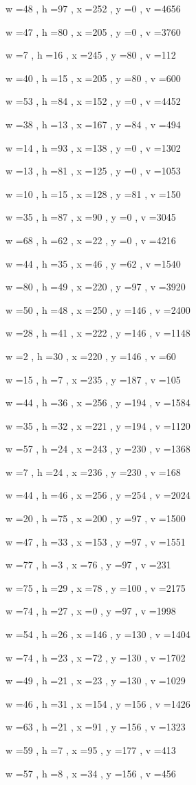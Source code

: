 \documentclass[11pt]{article}
\begin{document}
w =48 , h =97 , x =252 , y =0 , v =4656
\par
w =47 , h =80 , x =205 , y =0 , v =3760
\par
w =7 , h =16 , x =245 , y =80 , v =112
\par
w =40 , h =15 , x =205 , y =80 , v =600
\par
w =53 , h =84 , x =152 , y =0 , v =4452
\par
w =38 , h =13 , x =167 , y =84 , v =494
\par
w =14 , h =93 , x =138 , y =0 , v =1302
\par
w =13 , h =81 , x =125 , y =0 , v =1053
\par
w =10 , h =15 , x =128 , y =81 , v =150
\par
w =35 , h =87 , x =90 , y =0 , v =3045
\par
w =68 , h =62 , x =22 , y =0 , v =4216
\par
w =44 , h =35 , x =46 , y =62 , v =1540
\par
w =80 , h =49 , x =220 , y =97 , v =3920
\par
w =50 , h =48 , x =250 , y =146 , v =2400
\par
w =28 , h =41 , x =222 , y =146 , v =1148
\par
w =2 , h =30 , x =220 , y =146 , v =60
\par
w =15 , h =7 , x =235 , y =187 , v =105
\par
w =44 , h =36 , x =256 , y =194 , v =1584
\par
w =35 , h =32 , x =221 , y =194 , v =1120
\par
w =57 , h =24 , x =243 , y =230 , v =1368
\par
w =7 , h =24 , x =236 , y =230 , v =168
\par
w =44 , h =46 , x =256 , y =254 , v =2024
\par
w =20 , h =75 , x =200 , y =97 , v =1500
\par
w =47 , h =33 , x =153 , y =97 , v =1551
\par
w =77 , h =3 , x =76 , y =97 , v =231
\par
w =75 , h =29 , x =78 , y =100 , v =2175
\par
w =74 , h =27 , x =0 , y =97 , v =1998
\par
w =54 , h =26 , x =146 , y =130 , v =1404
\par
w =74 , h =23 , x =72 , y =130 , v =1702
\par
w =49 , h =21 , x =23 , y =130 , v =1029
\par
w =46 , h =31 , x =154 , y =156 , v =1426
\par
w =63 , h =21 , x =91 , y =156 , v =1323
\par
w =59 , h =7 , x =95 , y =177 , v =413
\par
w =57 , h =8 , x =34 , y =156 , v =456
\par
\newpage
\end{document}
